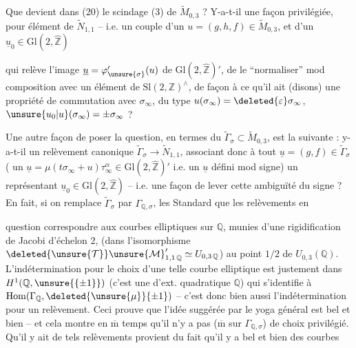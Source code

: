 Que devient dans (20) le scindage (3) de $\widetilde{M}_{0,3}$ ? Y-a-t-il une façon privilégiée, pour  élément de $\widetilde{N}_{1,1}$ -- i.e. un couple d'un $u=(g,h,f)\in\widetilde{M}_{0,3}$, et d'un $\underline{u}_0\in\mathrm{Gl}(2,\widehat{\mathbb Z})$


qui relève l'image $\underline{u}=\varphi'_{\unsure{\sigma}}(u)$ de $\mathrm{Gl}(2,\widehat{\mathbb Z})'$, de le ``normaliser'' mod  composition avec un élément de $\mathrm{Sl}(2,\mathbb Z)^\wedge$, de façon à ce qu'il ait  (disons) une propriété de commutation avec $\sigma_\infty$, du type $u(\sigma_\infty)=\deleted{\varepsilon}\sigma_\infty$,  $\unsure{u_0|u}(\sigma_\infty)=\pm\sigma_\infty$ ?

Une autre façon de poser la question, en termes du  $\widetilde{\Gamma}_\sigma\subset\widetilde{M}_{0,3}$, est la suivante : y-a-t-il un relèvement canonique $\widetilde{\Gamma}_\sigma\longrightarrow\widetilde{N}_{1,1}$, associant donc à tout $\underline{u}=(g,f)\in\widetilde{\Gamma}_\sigma$ ( un $\underline{u}=\mu(t\sigma_\infty+u)\tau_\infty^\alpha\in\mathrm{Gl}(2,\widehat{\mathbb Z})'$\unsure{,|\}}  i.e. un $\underline{u}$ défini mod signe) un représentant $\underline{u}_0\in\mathrm{Gl}(2,\widehat{\mathbb Z})$ -- i.e. une façon de lever cette ambiguïté du signe ? En fait, si on remplace $\widetilde{\Gamma}_\sigma$ par $\Gamma_{\mathbb Q,\sigma}$, les  Standard  que les relèvements en


question  correspondre aux courbes elliptiques sur $\mathbb Q$, munies d'une rigidification de Jacobi d'échelon $2$,  (dans l'isomorphisme $\deleted{\unsure{\mathcal T}}\unsure{\mathcal M}_{1,1\,\mathbb Q}'\simeq U_{0,3\,\mathbb Q}$) au point $1/2$ de $U_{0,3}(\mathbb Q)$. L'indétermination pour le choix d'une telle courbe elliptique est justement dans $H^1(\mathbb Q,\unsure{\{\pm1\}})$ (c'est une  d'ext. quadratique  $\mathbb Q$) qui s'identifie à $\mathrm{Hom}(\Gamma_{\mathbb Q},\deleted{\unsure{\mu}}\{\pm1\})$ -- c'est donc bien aussi l'indétermination pour un relèvement. Ceci prouve  que l'idée suggérée par le yoga général est bel et bien  -- et cela montre en $\overline{\mathrm m}$ temps qu'il n'y a pas ($\overline{\mathrm m}$ sur $\Gamma_{\mathbb Q,\sigma}$) de choix  privilégié. Qu'il y ait de tels relèvements  provient du fait qu'il y a bel et bien des courbes

